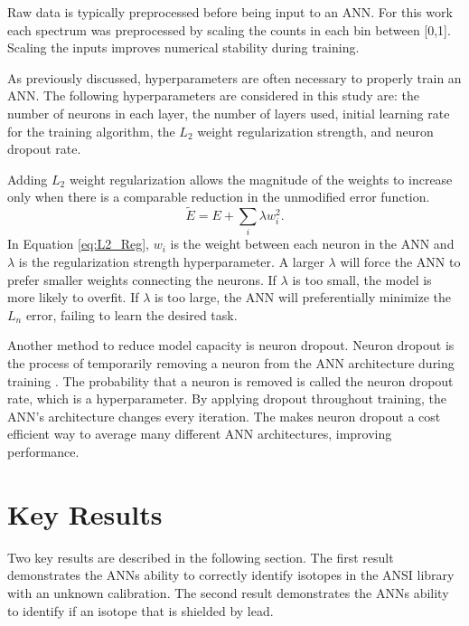 \documentclass[tocnosub,noragright,centerchapter,12pt,fullpage]{uiucecethesis09}
\begin{document}
Raw data is typically preprocessed before being input to an ANN. For this work each spectrum was preprocessed by scaling the counts in each bin between [0,1]. Scaling the inputs improves numerical stability during training. 

As previously discussed, hyperparameters are often necessary to properly train an ANN. The following hyperparameters are considered in this study are: the number of neurons in each layer, the number of layers used, initial learning rate for the training algorithm, the $L_2$ weight regularization strength, and neuron dropout rate. 

Adding $L_2$ weight regularization allows the magnitude of the weights to increase only when there is a comparable reduction in the unmodified error function.
%
\begin{equation} \label{eq:L2_Reg}
\tilde{E} = E + \sum_i \lambda w_i^2.
\end{equation}
%
In Equation \ref{eq:L2_Reg}, $w_i$ is the weight between each neuron in the ANN and $\lambda$ is the regularization strength hyperparameter. A larger $\lambda$ will force the ANN to prefer smaller weights connecting the neurons. If $\lambda$ is too small, the model is more likely to overfit. If $\lambda$ is too large, the ANN will preferentially minimize the $L_n$ error, failing to learn the desired task.

Another method to reduce model capacity is neuron dropout. Neuron dropout is the process of temporarily removing a neuron from the ANN architecture during training \cite{Srivastava2014}. The probability that a neuron is removed is called the neuron dropout rate, which is a hyperparameter. By applying dropout throughout training, the ANN's architecture changes every iteration. The makes neuron dropout a cost efficient way to average many different ANN architectures, improving performance.



\section{Key Results}

Two key results are described in the following section. The first result demonstrates the ANNs ability to correctly identify isotopes in the ANSI library with an unknown calibration.  The second result demonstrates the ANNs ability to identify if an isotope that is shielded by lead.  
\end{document}
